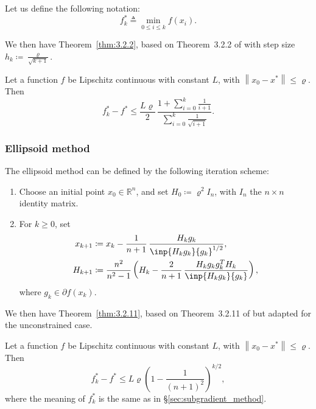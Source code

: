 \documentclass[final]{aomart}
\newcommand{\Rn}{\mathbb{R}^n}
\newcommand{\xk}{x_k}
\newcommand{\xopt}{x^*}
\newtheorem[{}\it]{thm}{Theorem}[section]
\theoremstyle{definition}
\newtheorem*[{}\it]{notation}{Notation}
\numberwithin{equation}{section}
\newcommand{\thmref}[1]{Theorem~\ref{#1}}
\newcommand{\secref}[1]{\S\ref{#1}}
\renewcommand{\rho}{\varrho}
\newcommand{\enVert}[1]{\left\lVert#1\right\rVert}
\let\norm=\enVert
\begin{document}
Let us define the following notation:
\begin{equation}
f^*_k \triangleq \min_{0 \leqslant i \leqslant k} f(x_i).
\end{equation}

We then have \thmref{thm:3.2.2}, based on Theorem~3.2.2 of \cite{Nesterov2018} with step size \(h_k \coloneqq \frac{\rho}{\sqrt{k+1}}\).
\begin{thm}
	\label{thm:3.2.2}
	Let a function \(f\) be Lipschitz continuous with constant \(L\), with \(\norm{x_0 - \xopt} \leqslant \rho\).
	Then
	\begin{equation}
	f^*_k - f^* \leqslant \frac{L\rho}{2}\,\frac{1 + \sum_{i=0}^k \frac{1}{i+1}}{\sum_{i=0}^k \frac{1}{\sqrt{i+1}}}.
	\end{equation}
\end{thm}

\subsubsection{Ellipsoid method}
The ellipsoid method can be defined by the following iteration scheme:
\begin{enumerate}
	\item Choose an initial point \(x_0 \in \Rn\), and set \(H_0 \coloneqq \rho^2 I_n\), with \(I_n\) the \(n \times n\) identity matrix.
	\item For \(k \geqslant 0\), set
	\begin{align}
	x_{k+1} &\coloneqq \xk - \frac{1}{n+1}\, \frac{H_k g_k}{\inp{H_k g_k}{g_k}^{1/2}},\\
	H_{k+1} &\coloneqq \frac{n^2}{n^2-1} \left(H_k - \frac{2}{n+1} \, \frac{H_k g_k g_k^T H_k}{\inp{H_k g_k}{g_k}}\right),
	\end{align}
	where \(g_k \in \partial f(x_k)\).
\end{enumerate}

We then have \thmref{thm:3.2.11}, based on Theorem~3.2.11 of \cite{Nesterov2018} but adapted for the unconstrained case.
\begin{thm}
	\label{thm:3.2.11}
	Let a function \(f\) be Lipschitz continuous with constant \(L\), with \(\norm{x_0 - \xopt} \leqslant \rho\).
	Then
	\begin{equation}
	f^*_k - f^* \leqslant L \rho \left(1 - \frac{1}{(n+1)^2}\right)^{k/2},
	\end{equation}
	where the meaning of \(f^*_k\) is the same as in \secref{sec:subgradient_method}.
\end{thm}
\end{document}
